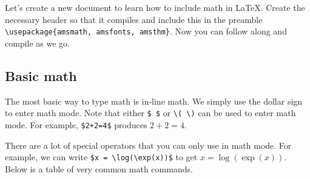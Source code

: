 Let's create a new document to learn how to include math in \LaTeX{}. Create the necessary header so that it compiles and include this in the preamble \verb|\usepackage{amsmath, amsfonts, amsthm}|. Now you can follow along and compile as we go.

\subsection{Basic math}
 
The most basic way to type math is in-line math. We simply use the dollar sign to enter math mode. Note that either \verb|$ $| or \verb|\( \)| can be used to enter math mode. For example, \verb|$2+2=4$| produces $2+2=4$.

There are a lot of special operators that you can only use in math mode. For example, we can write \verb|$x = \log(\exp(x))$| to get $x = \log(\exp(x))$. Below is a table of very common math commands.

